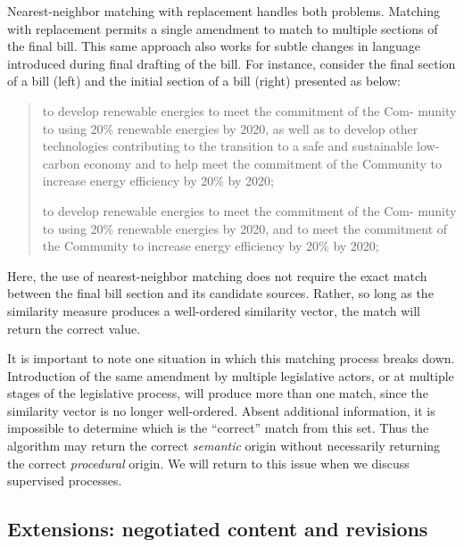 \documentclass[11pt]{article}
\begin{document}
Nearest-neighbor matching with replacement handles both
problems. Matching with replacement permits a single amendment to
match to multiple sections of the final bill. This same approach also works for subtle changes in language
introduced during final drafting of the bill. For instance, consider
the final section of a bill (left) and the initial section of a bill
(right) presented as below:
\begin{quote}
  \begin{minipage}[t]{0.45\linewidth}
    to develop renewable energies to meet the commitment of the Com-
    munity to using 20\% renewable energies by 2020, as well as to
    develop other technologies contributing to the transition to a
    safe and sustainable low-carbon economy and to help meet the commitment of the Community to increase energy efficiency by 20\% by
    2020;
  \end{minipage}
  \begin{minipage}[h]{0.08\linewidth}
  \end{minipage}
  \begin{minipage}[t]{0.45\linewidth}
    to develop renewable energies to meet the commitment of the Com-
    munity to using 20\% renewable energies by 2020, and to meet the
    commitment of the Community to increase energy efficiency by 20\%
    by 2020;
  \end{minipage}
\end{quote}

Here, the use of nearest-neighbor matching does not require the exact
match between the final bill section and its candidate
sources. Rather, so long as the similarity measure produces a
well-ordered similarity vector, the match will return the correct value.

It is important to note one situation in which this matching process
breaks down. Introduction of the same amendment by multiple
legislative actors, or at multiple stages of the legislative process, will produce more than one match, since the
similarity vector is no longer well-ordered. Absent additional
information, it is impossible to determine which is the ``correct''
match from this set. Thus the algorithm may return the correct
\textit{semantic} origin without necessarily returning the correct
\textit{procedural} origin. We will return to this issue when we discuss
supervised processes.

\subsection{Extensions: negotiated content and revisions}
\label{sec:extens-negot-cont}
\end{document}
